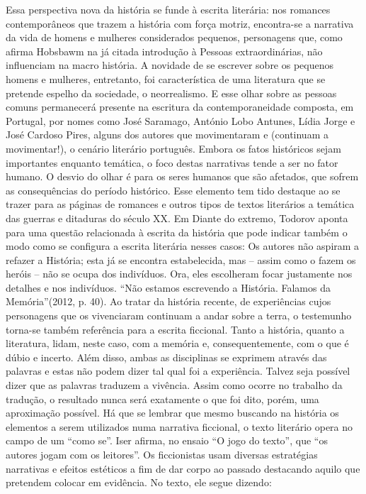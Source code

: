 \documentclass[../DISSERTACAO_MAIN.tex]{subfiles}
\begin{document}
Essa perspectiva nova da história se funde à escrita literária: nos romances contemporâneos que trazem a história com força motriz, encontra-se a narrativa da vida de homens e mulheres considerados pequenos, personagens que, como afirma Hobsbawm na já citada introdução à Pessoas extraordinárias, não influenciam na macro história. A novidade de se escrever sobre os pequenos homens e mulheres, entretanto, foi característica de uma literatura que se pretende espelho da sociedade, o neorrealismo. E esse olhar sobre as pessoas comuns permanecerá presente na escritura da contemporaneidade composta, em Portugal, por nomes como José Saramago, António Lobo Antunes, Lídia Jorge e José Cardoso Pires, alguns dos autores que movimentaram e (continuam a movimentar!), o cenário literário português. 
Embora os fatos históricos sejam importantes enquanto temática, o foco destas narrativas tende a ser no fator humano. O desvio do olhar é para os seres humanos que são afetados, que sofrem as consequências do período histórico. Esse elemento tem tido destaque ao se trazer para as páginas de romances e outros tipos de textos literários a temática das guerras e ditaduras do século XX. Em Diante do extremo, Todorov aponta para uma questão relacionada à escrita da história que pode indicar também o modo como se configura a escrita literária nesses casos: 
Os autores não aspiram a refazer a História; esta já se encontra estabelecida, mas – assim como o fazem os heróis – não se ocupa dos indivíduos. Ora, eles escolheram focar justamente nos detalhes e nos indivíduos. “Não estamos escrevendo a História. Falamos da Memória”(2012, p. 40). 
Ao tratar da história recente, de experiências cujos personagens que os vivenciaram continuam a andar sobre a terra, o testemunho torna-se também referência para a escrita ficcional. Tanto a história, quanto a literatura, lidam, neste caso, com a memória e, consequentemente, com o que é dúbio e incerto. Além disso, ambas as disciplinas se exprimem através das palavras e estas não podem dizer tal qual foi a experiência. Talvez seja possível dizer que as palavras traduzem a vivência. Assim como ocorre no trabalho da tradução, o resultado nunca será exatamente o que foi dito, porém, uma aproximação possível. 
Há que se lembrar que mesmo buscando na história os elementos a serem utilizados numa narrativa ficcional, o texto literário opera no campo de um “como se”. Iser afirma, no ensaio “O jogo do texto”, que “os autores jogam com os leitores”. Os ficcionistas usam diversas estratégias narrativas e efeitos estéticos a fim de dar corpo ao passado destacando aquilo que pretendem colocar em evidência. No texto, ele segue dizendo:
\end{document}
